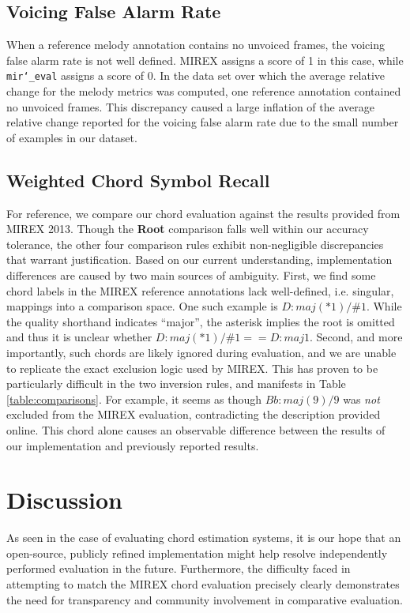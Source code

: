 \documentclass{article}
\def\mireval{\texttt{mir\char`_eval}}
\begin{document}
\subsection{Voicing False Alarm Rate}

When a reference melody annotation contains no unvoiced frames, the voicing false alarm rate is not well defined.
MIREX assigns a score of 1 in this case, while \mireval{} assigns a score of 0.
In the data set over which the average relative change for the melody metrics was computed, one reference annotation contained no unvoiced frames.
This discrepancy caused a large inflation of the average relative change reported for the voicing false alarm rate due to the small number of examples in our dataset.

\subsection{Weighted Chord Symbol Recall}
For reference, we compare our chord evaluation against the results provided from MIREX 2013.
Though the \textbf{Root} comparison falls well within our accuracy tolerance, the other four comparison rules exhibit non-negligible discrepancies that warrant justification.
Based on our current understanding, implementation differences are caused by two main sources of ambiguity.
First, we find some chord labels in the MIREX reference annotations lack well-defined, i.e. singular, mappings into a comparison space. 
One such example is $D:maj(*1)/\#1$.
While the quality shorthand indicates ``major'', the asterisk implies the root is omitted and thus it is unclear whether $D:maj(*1)/\#1==D:maj1$.
Second, and more importantly, such chords are likely ignored during evaluation, and we are unable to replicate the exact exclusion logic used by MIREX. 
This has proven to be particularly difficult in the two inversion rules, and manifests in Table \ref{table:comparisons}. 
For example, it seems as though $Bb:maj(9)/9$ was \emph{not} excluded from the MIREX evaluation, contradicting the description provided online.
This chord alone causes an observable difference between the results of our implementation and previously reported results.

\section{Discussion}
\label{sec:discussion}

As seen in the case of evaluating chord estimation systems, it is our hope that an open-source, publicly refined implementation might help resolve independently performed evaluation in the future. 
Furthermore, the difficulty faced in attempting to match the MIREX chord evaluation precisely clearly demonstrates the need for transparency and community involvement in comparative evaluation.


\end{document}
